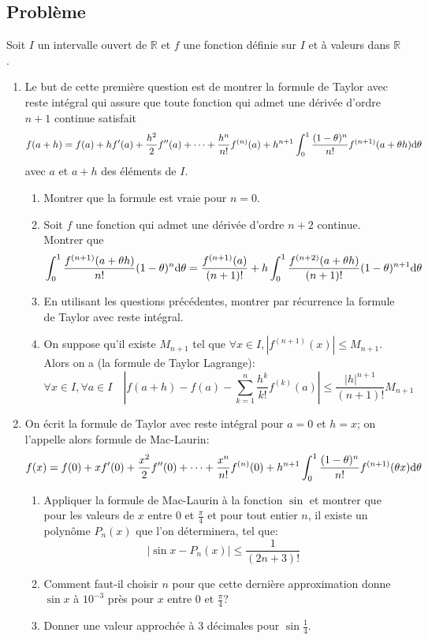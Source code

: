 \documentclass{article}[11pt]
\def \de {{\rm d}}
\begin{document}
\subsection*{Problème}
Soit $I$ un intervalle ouvert de $\mathbb{R}$ et $f$ une fonction définie sur $I$ et à valeurs dans $\mathbb{R}$.
\begin{enumerate}
\item Le but de cette première question est de montrer la formule de Taylor avec reste intégral qui assure que toute fonction qui admet une dérivée d'ordre $n+1$ continue satisfait
\[f(a+h)=f(a)+hf'(a)+\frac{h^2}{2}f''(a)+\cdots+\frac{h^n}{n!}f^{(n)}(a)+h^{n+1}\int_0^1\frac{(1-\theta)^n}{n!}f^{(n+1)}(a+\theta h)\de \theta\]
avec $a$ et $a+h$ des éléments de $I$.
\begin{enumerate}
\item  Montrer que la formule est vraie pour $n=0$.
\item  Soit $f$ une fonction qui admet une dérivée d'ordre $n+2$ continue. Montrer que
\[\int_0^1\frac{f^{(n+1)}(a+\theta h)}{n!}(1-\theta)^n\de \theta=\frac{f^{(n+1)}(a)}{(n+1)!}+h\int_0^1\frac{f^{(n+2)}(a+\theta h)}{(n+1)!}(1-\theta)^{n+1}\de \theta\]
\item  En utilisant les questions précédentes, montrer par récurrence la formule de Taylor avec reste intégral.
\item On suppose qu'il existe $M_{n+1}$ tel que $\forall x\in I,  |f^{(n+1)}(x)|\leq M_{n+1}$. Alors on a (la formule de Taylor Lagrange): 
$$\displaystyle{\forall x\in I,\forall a\in I} \quad\displaystyle{\left\vert f(a+h)-f(a)-\sum_{k=1}^{n}\frac{h^k}{k!}f^{(k)}(a)\right\vert\leq \frac{\vert h\vert^{n+1}}{(n+1)!}}M_{n+1}$$
\end{enumerate}

\item  On écrit la formule de Taylor avec reste intégral pour $a=0$ et $h=x$; on l'appelle alors formule de Mac-Laurin:
\[f(x)=f(0)+xf'(0)+\frac{x^2}{2}f''(0)+\cdots+\frac{x^n}{n!}f^{(n)}(0)+h^{n+1}\int_0^1\frac{(1-\theta)^n}{n!}f^{(n+1)}(\theta x)\de \theta\]
\begin{enumerate}
\item Appliquer la formule de Mac-Laurin à la fonction $\sin$ et montrer que pour les valeurs de $x$ entre $0$ et $\frac{\pi}{4}$ et pour tout entier $n$, il existe un polynôme $P_n(x)$ que l'on déterminera, tel que:
\[|\sin x - P_n(x)|\leq \frac{1}{(2n+3)!}\]
\item Comment faut-il choisir $n$ pour que cette dernière approximation donne $\sin x$ à $10^{-3}$ près pour $x$ entre 0 et $\frac{\pi}{4}$?
\item Donner une valeur approchée à 3 décimales pour $\sin \frac 14$.
\end{enumerate}
\end{enumerate}
\end{document}
